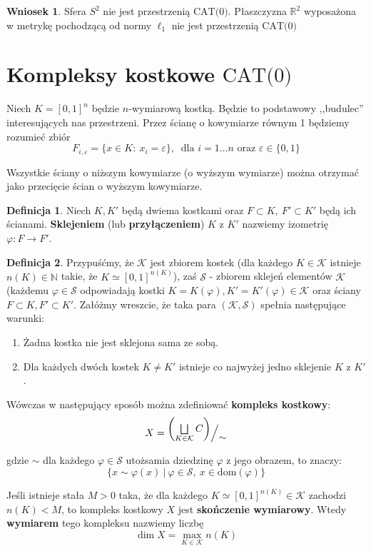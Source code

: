 \documentclass[licencjacka]{pracamgr}
\theoremstyle{definition}
\newtheorem{definition}{Definicja}[section]
\theoremstyle{definition}
\theoremstyle{definition}
\theoremstyle{definition}
\theoremstyle{definition}
\newtheorem{corollary}{Wniosek}[section]
\theoremstyle{plain}
\theoremstyle{plain}
\def\quotient#1#2{%
    \raise1ex\hbox{$#1$}\Big/\lower1ex\hbox{$#2$}%
}
\begin{document}
\begin{corollary}
	Sfera $ S^2 $ nie jest przestrzenią $ \text{CAT(0)} $. Płaszczyzna $ \mathbb{R}^2 $ 
	wyposażona w metrykę pochodzącą od normy $ \ell_1 $ nie jest przestrzenią $ \text{CAT(0)} $
\end{corollary}

\section{Kompleksy kostkowe $ \text{CAT(0)} $}
Niech $ K = [0,1]^n $ będzie $ n $-wymiarową kostką. Będzie to podstawowy ,,budulec'' 
interesujących nas przestrzeni. Przez ścianę o kowymiarze równym 1 będziemy rozumieć zbiór 
$$ F_{i,\varepsilon}  = \{x \in K : ~ x_i = \varepsilon\}, ~ \text{ dla } i = 1 
\dots n \text{ oraz }\varepsilon \in \{0,1\}$$

Wszystkie ściany o niższym kowymiarze (o wyższym wymiarze) można otrzymać jako 
przecięcie ścian o wyższym kowymiarze.

\begin{definition}
	Niech $ K,K' $ będą dwiema kostkami oraz $ F \subset K, ~ F' \subset K' $ będą 
	ich ścianami. \textbf{Sklejeniem} (lub \textbf{przyłączeniem}) $ K $ z $ K' $ nazwiemy 
	izometrię $ \varphi: F \rightarrow F' $.
\end{definition}

\begin{definition}
	Przypuśćmy, że $ \mathcal{K} $ jest zbiorem kostek (dla każdego $ K \in 
	\mathcal{K} $ istnieje $ n(K) \in \mathbb{N} $ takie, że $ K \simeq [0,1]^{n(K)} $), 
	zaś $ \mathcal{S} $ - zbiorem sklejeń elementów $ \mathcal{K} $ (każdemu 
	$ \varphi \in \mathcal{S} $ odpowiadają kostki $ K = K(\varphi), K' = 
	K'(\varphi) \in \mathcal{K} $ oraz ściany $ F \subset K, F' \subset K' $. Załóżmy 
	wreszcie, że taka para 	$ (\mathcal{K}, \mathcal{S})  $ spełnia następujące warunki:

	\begin{enumerate}
		\item Żadna kostka nie jest sklejona sama ze sobą.
		\item Dla każdych dwóch kostek $ K \neq K' $ istnieje co najwyżej jedno
		sklejenie $ K $ z $ K'$.
	\end{enumerate}

	Wówczas w następujący sposób można zdefiniować \textbf{kompleks kostkowy}:
	$$ X =  \quotient{\left( \bigsqcup\limits_{K \in \mathcal{K}} C \right)}{\sim} $$

	gdzie $ \sim $ dla każdego $ \varphi \in \mathcal{S} $ utożsamia dziedzinę $ \varphi $ 
	z jego obrazem, to znaczy: $$ \{ x \sim \varphi(x) ~ | ~ \varphi \in \mathcal{S}, ~ 
	x \in \text{dom}(\varphi) \} $$

	Jeśli istnieje stała $ M > 0 $ taka, że dla każdego $  K  \simeq [0,1]^{n(K)}\in 
	\mathcal{K} $ zachodzi $ n(K) < M $, to kompleks kostkowy $ X $ jest \textbf{skończenie 
	wymiarowy}. Wtedy \textbf{wymiarem} tego kompleksu nazwiemy liczbę 
	$$ \dim X = \max\limits_{K \in \mathcal{K}} n(K)$$
\end{definition}
\end{document}
